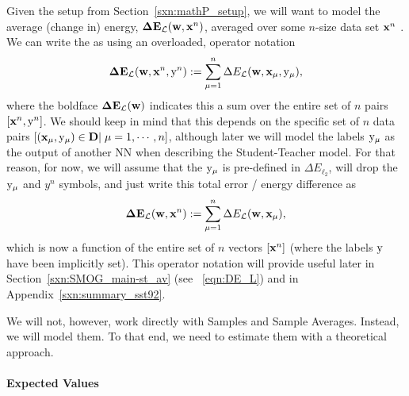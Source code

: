 Given the setup from Section~\ref{sxn:mathP_setup},
we will want to model the average (change in) energy,  $\mathbf{\Delta {E}}_{\mathcal{L}}(\mathbf{w}, \mathbf{x}^{n})$, averaged over some $n$-size data set $\mathbf{x}^{n}$ .
We can write the \TotalDataSampleError as
using an overloaded, operator notation 
\begin{align}
  \label{eqn:detopxy}
  \mathbf{\Delta {E}}_{\mathcal{L}}(\mathbf{w}, \mathbf{x}^{n}, \mathrm{y}^{n}) :=\sum_{\mu=1}^{n}\Delta E_{\mathcal{L}}({\mathbf{w}},{\mathbf{x}}_{\mu}, \mathrm{y}_{\mu})  ,
\end{align}
where the boldface $\mathbf{\Delta {E}}_{\mathcal{L}}(\mathbf{w})$ indicates this a sum over the entire set of  $n$ pairs $[\mathbf{x}^{n}, \mathrm{y}^{n}]$.
We should keep in mind that this depends on the specific set of $n$ data pairs
$[({\mathbf{x}}_{\mu},\mathrm{y}_{\mu})\in\mathbf{D}|\;\mu=1,\cdots,n]$, 
although later we will model the labels $\mathrm{y}_{\mu}$ as the output of another NN
when describing the Student-Teacher model.
%
For that reason, for now, we
will assume that the $\mathrm{y}_{\mu}$ is pre-defined in $\Delta E_{\ell_2}$,
will drop the $\mathrm{y}_{\mu}$ and $y^{n}$ symbols, 
and just write this total error / energy difference as
\begin{align}
  \label{eqn:detox}
  \mathbf{\Delta {E}}_{\mathcal{L}}(\mathbf{w}, \mathbf{x}^{n}) :=\sum_{\mu=1}^{n}\Delta E_{\mathcal{L}}({\mathbf{w}},{\mathbf{x}}_{\mu})  ,
\end{align}
which is now a function of the entire set of  $n$ vectors $[\mathbf{x}^{n}]$
(where the labels $\mathrm{y}$ have been implicitly set).
This operator notation will provide useful later in Section~\ref{sxn:SMOG_main-st_av}
(see \EQN~\ref{eqn:DE_L}) and in Appendix~\ref{sxn:summary_sst92}.

We will not, however,  work directly with Samples and Sample Averages.
Instead, we will model them.
To that end, we need to estimate them with a theoretical approach.


\paragraph{Expected Values}


